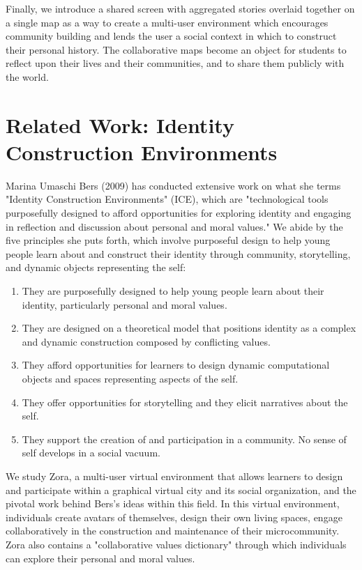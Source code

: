 \documentclass{sigchi-ext}
\begin{document}
Finally, we introduce a shared screen with aggregated stories overlaid together on a single map as a way to create a multi-user environment which encourages community building and lends the user a social context in which to construct their personal history. The collaborative maps become an object for students to reflect upon their lives and their communities, and to share them publicly with the world.

\section{Related Work: Identity Construction Environments}

Marina Umaschi Bers (2009) has conducted extensive work on what she terms "Identity Construction Environments" (ICE), which are "technological tools purposefully designed to afford opportunities for exploring identity and engaging in reflection and discussion about personal and moral values." We abide by the five principles she puts forth, which involve purposeful design to help young people learn about and construct their identity through community, storytelling, and dynamic objects representing the self:

\begin{enumerate}\compresslist
	\item They are purposefully designed to help young people learn about their identity, particularly personal and moral values.
	\item They are designed on a theoretical model that positions identity as a complex and dynamic construction composed by conflicting values.
	\item They afford opportunities for learners to design dynamic computational objects and spaces representing aspects of the self.	 							
	\item They offer opportunities for storytelling and they elicit narratives about the self.
	\item They support the creation of and participation in a community. No sense of self develops in a social vacuum.
\end{enumerate}

We study Zora, a multi-user virtual environment that allows learners to design and participate within a graphical virtual city and its social organization, and the pivotal work behind Bers's ideas within this field. In this virtual environment, individuals create avatars of themselves, design their own living spaces, engage collaboratively in the construction and maintenance of their microcommunity. Zora also contains a "collaborative values dictionary" through which individuals can explore their personal and moral values. 
\end{document}
